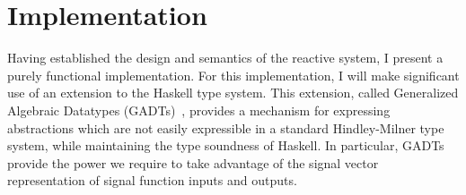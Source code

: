 \chapter{Implementation}
\label{chapter:Implementation}

Having established the design and semantics of the reactive system, I present a purely 
functional implementation. For this implementation, I will make significant use
of an extension to the Haskell type system. This extension, called
Generalized Algebraic Datatypes (GADTs)~\cite{Cheney2003,Xi2003}, provides a mechanism
for expressing abstractions which are not easily expressible in a standard
Hindley-Milner type system, while maintaining the type soundness of Haskell.
In particular, GADTs provide the power we require to take advantage of the
signal vector representation of signal function inputs and outputs.




